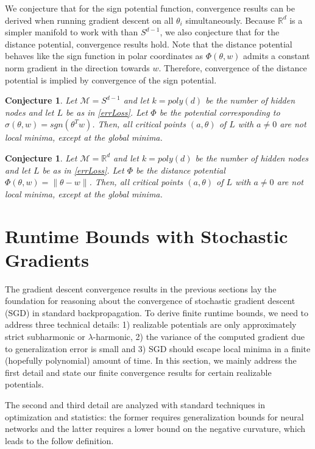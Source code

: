 \documentclass{article}
\newtheorem{conjecture}[theorem]{Conjecture}
\newcommand{\R}{{\mathbb{R}}}
\begin{document}
We conjecture that for the sign potential function, convergence results can be derived when running gradient descent on all $\theta_i$ simultaneously. Because $\R^d$ is a simpler manifold to work with than $S^{d-1}$, we also conjecture that for the distance potential, convergence results hold. Note that the distance potential behaves like the sign function in polar coordinates as $\Phi(\theta, w)$ admits a constant norm gradient in the direction towards $w$. Therefore, convergence of the distance potential is implied by convergence of the sign potential. 

\begin{conjecture}
 Let $\mathcal{M} = S^{d-1}$ and let $k = poly(d)$ be the number of hidden nodes and let $L$ be as in \eqref{errLoss}. Let $\Phi$ be the potential corresponding to $\sigma(\theta,w) = sgn(\theta^Tw)$. Then, all critical points $(a,\theta)$ of $L$ with $a \neq 0$ are not local minima, except at the global minima. 
\end{conjecture}

\begin{conjecture}
 Let $\mathcal{M} = \R^d$ and let $k = poly(d)$ be the number of hidden nodes and let $L$ be as in \eqref{errLoss}. Let $\Phi$ be the distance potential $\Phi(\theta,w) = \|\theta - w\|$. Then, all critical points $(a,\theta)$ of $L$ with $a \neq 0$ are not local minima, except at the global minima.
\end{conjecture}


\section{Runtime Bounds with Stochastic Gradients}

The gradient descent convergence results in the previous sections lay the foundation for reasoning about the convergence of stochastic gradient descent (SGD) in standard backpropagation. To derive finite runtime bounds, we need to address three technical details: 1) realizable potentials are only approximately strict subharmonic or $\lambda$-harmonic, 2) the variance of the computed gradient due to generalization error is small and 3) SGD should escape local minima in a finite (hopefully polynomial) amount of time. In this section, we mainly address the first detail and state our finite convergence results for certain realizable potentials. 

The second and third detail are analyzed with standard techniques in optimization and statistics: the former requires generalization bounds for neural networks and the latter requires a lower bound on the negative curvature, which leads to the follow definition.
\end{document}
